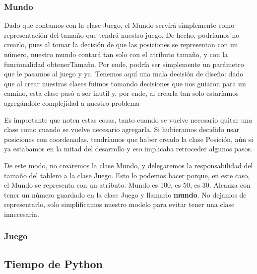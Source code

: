 \documentclass{article}
\begin{document}
\subsubsection{Mundo}
Dado que contamos con la clase Juego, el Mundo servirá simplemente como representación del tamaño que tendrá nuestro juego. De hecho, podríamos no crearlo, pues al tomar la decisión de que las posiciones se representan con un número, nuestro mundo contará tan solo con el atributo tamaño, y con la funcionalidad obtenerTamaño. Por ende, podría ser simplemente un parámetro que le pasamos al juego y ya. Tenemos aquí una mala decisión de diseño: dado que al crear nuestras clases fuimos tomando decisiones que nos guiaron para un camino, esta clase pasó a ser inutil y, por ende, al crearla tan solo estaríamos agregándole complejidad a nuestro problema

Es importante que noten estas cosas, tanto cuando se vuelve necesario quitar una clase como cuando se vuelve necesario agregarla. Si hubieramos decidido usar posiciones con coordenadas, tendríamos que haber creado la clase Posición, aún si ya estabamos en la mitad del desarrollo y eso implicaba retroceder algunos pasos.

De este modo, no crearemos la clase Mundo, y delegaremos la responsabilidad del tamaño del tablero a la clase Juego. Esto lo podemos hacer porque, en este caso, el Mundo se representa con un atributo. Mundo es 100, es 50, es 30. Alcanza con tener un número guardado en la clase Juego y llamarlo \textbf{mundo}. No dejamos de representarlo, solo simplificamos nuestro modelo para evitar tener una clase innecesaria.

\subsubsection{Juego}

\subsection{Tiempo de Python}
\end{document}
